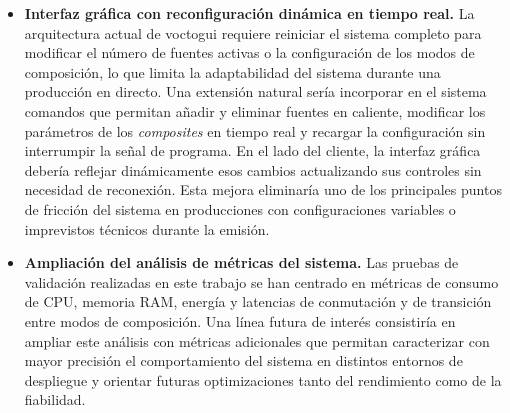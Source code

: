 \begin{itemize}
  \item \textbf{Interfaz gráfica con reconfiguración dinámica en tiempo real.}
  La arquitectura actual de voctogui requiere reiniciar el sistema completo para
  modificar el número de fuentes activas o la configuración de los modos de
  composición, lo que limita la adaptabilidad del sistema durante una producción en
  directo. Una extensión natural sería incorporar en el sistema comandos que permitan
  añadir y eliminar fuentes en caliente, modificar los parámetros de los \textit{composites}
  en tiempo real y recargar la configuración sin interrumpir la señal de programa.
  En el lado del cliente, la interfaz gráfica debería reflejar dinámicamente esos
  cambios actualizando sus controles sin necesidad de reconexión. Esta mejora
  eliminaría uno de los principales puntos de fricción del sistema en producciones
  con configuraciones variables o imprevistos técnicos durante la emisión.

  \item \textbf{Ampliación del análisis de métricas del sistema.}
  Las pruebas de validación realizadas en este trabajo se han centrado en métricas de
  consumo de CPU, memoria RAM, energía y latencias de conmutación y de transición
  entre modos de composición. Una línea futura de interés consistiría en ampliar
  este análisis con métricas adicionales que permitan caracterizar con mayor precisión
  el comportamiento del sistema en distintos entornos de despliegue y orientar futuras
  optimizaciones tanto del rendimiento como de la fiabilidad.

\end{itemize}
